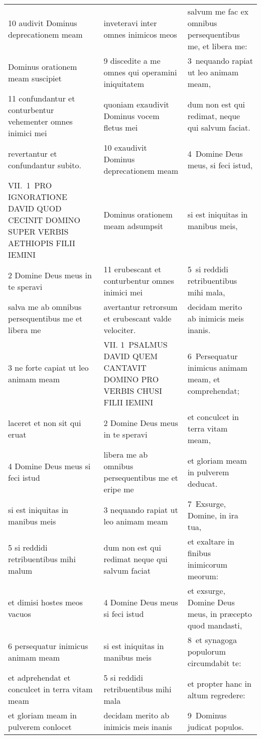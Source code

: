 \documentclass{article}
\begin{document}
\begin{longtable}{@{}p{}p{}p{}@{}}
10 audivit Dominus deprecationem meam	&	inveteravi inter omnes inimicos meos	&	salvum me fac ex omnibus persequentibus me, et libera me:	\\
Dominus orationem meam suscipiet	&	9 discedite a me omnes qui operamini iniquitatem	&	3 nequando rapiat ut leo animam meam,	\\
11 confundantur et conturbentur vehementer omnes inimici mei	&	quoniam exaudivit Dominus vocem fletus mei	&	dum non est qui redimat, neque qui salvum faciat.	\\
revertantur et confundantur subito.	&	10 exaudivit Dominus deprecationem meam	&	4 Domine Deus meus, si feci istud,	\\
VII. 1 PRO IGNORATIONE DAVID QUOD CECINIT DOMINO SUPER VERBIS AETHIOPIS FILII IEMINI	&	Dominus orationem meam adsumpsit	&	si est iniquitas in manibus meis,	\\
2 Domine Deus meus in te speravi	&	11 erubescant et conturbentur omnes inimici mei	&	5 si reddidi retribuentibus mihi mala,	\\
salva me ab omnibus persequentibus me et libera me	&	avertantur retrorsum et erubescant valde velociter.	&	decidam merito ab inimicis meis inanis.	\\
3 ne forte capiat ut leo animam meam	&	VII. 1 PSALMUS DAVID QUEM CANTAVIT DOMINO PRO VERBIS CHUSI FILII IEMINI	&	6 Persequatur inimicus animam meam, et comprehendat;	\\
laceret et non sit qui eruat	&	2 Domine Deus meus in te speravi	&	et conculcet in terra vitam meam,	\\
4 Domine Deus meus si feci istud	&	libera me ab omnibus persequentibus me et eripe me	&	et gloriam meam in pulverem deducat.	\\
si est iniquitas in manibus meis	&	3 nequando rapiat ut leo animam meam	&	7 Exsurge, Domine, in ira tua,	\\
5 si reddidi retribuentibus mihi malum	&	dum non est qui redimat neque qui salvum faciat	&	et exaltare in finibus inimicorum meorum:	\\
et dimisi hostes meos vacuos	&	4 Domine Deus meus si feci istud	&	et exsurge, Domine Deus meus, in præcepto quod mandasti,	\\
6 persequatur inimicus animam meam	&	si est iniquitas in manibus meis	&	8 et synagoga populorum circumdabit te:	\\
et adprehendat et conculcet in terra vitam meam	&	5 si reddidi retribuentibus mihi mala	&	et propter hanc in altum regredere:	\\
et gloriam meam in pulverem conlocet	&	decidam merito ab inimicis meis inanis	&	9 Dominus judicat populos.	\\

\end{longtable}
\end{document}
